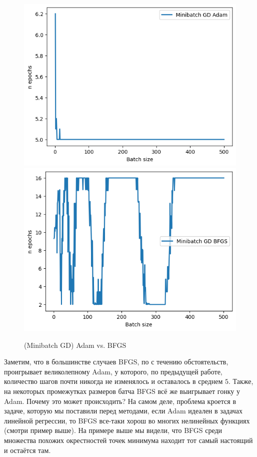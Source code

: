 \documentclass[12pt, a4paper, oneside, final]{article}
\begin{document}
	\begin{figure}[H]
		\centering
		\includegraphics[scale = 0.75]{Image/T2_ADAM_GENERAL.png}
		\includegraphics[scale = 0.75]{Image/T2_BFGS_GENERAL.png}
		\caption*{(Minibatch GD) Adam vs. BFGS}
	\end{figure}
	Заметим, что в большинстве случаев BFGS, по с течению обстоятельств, проигрывает великолепному Adam, у которого, по предыдущей работе, количество шагов почти никогда не изменялось и оставалось в среднем $5$.
	Также, на некоторых промежутках размеров батча BFGS всё же выигрывает гонку у Adam.
	Почему это может происходить?
	На самом деле, проблема кроется в задаче, которую мы поставили перед методами, если Adam идеален в задачах линейной регрессии, то BFGS все-таки хорош во многих нелинейных функциях (смотри пример выше).
	На примере выше мы видели, что BFGS среди множества похожих окрестностей точек минимума находит тот самый настоящий и остаётся там.
\end{document}
